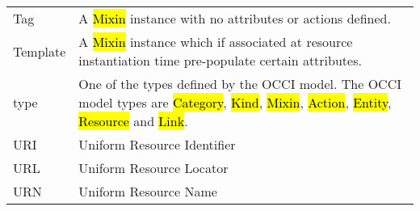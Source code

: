 \begin{tabular}{l|p{12cm}}
Tag & A \hl{Mixin} instance with no attributes or actions defined. \\

Template & A \hl{Mixin} instance which if associated at resource instantiation
time pre-populate certain attributes. \\

type & One of the types defined by the OCCI model.  The OCCI model types are
 \hl{Category}, \hl{Kind}, \hl{Mixin}, \hl{Action}, \hl{Entity}, \hl{Resource}
 and \hl{Link}. \\

URI & Uniform Resource Identifier \\
URL & Uniform Resource Locator \\
URN & Uniform Resource Name \\
\end{tabular}

